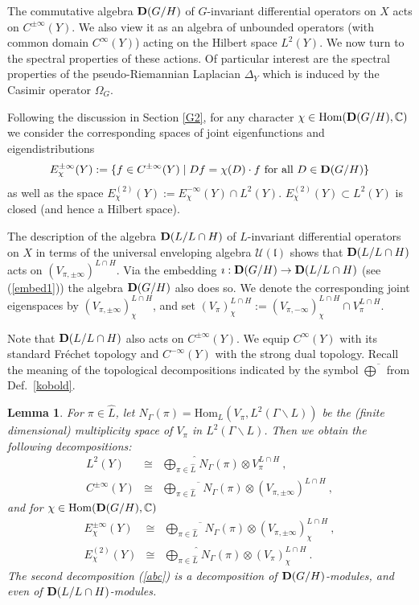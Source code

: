 \documentclass[10]{amsart}
\newtheorem{lem}[thm]{Lemma}
\theoremstyle{remark}
\theoremstyle{definition}
\numberwithin{equation}{section}
\newcommand{\C}{\mathbb{C}}           %
\newcommand{\Hom}{\mathrm{Hom}}
\newcommand{\fl}{{\mathfrak l}}
\newcommand{\Cal}{\mathcal}
\begin{document}
{The commutative algebra  ${\bf D}(G/H)$ of $G$-invariant differential operators on $X$ acts on $C^{\pm\infty}(Y)$. We also view it as an algebra of unbounded operators (with common domain $C^{\infty}(Y)$) acting on the Hilbert space $L^2(Y)$. We now turn to the spectral properties of these actions.
Of particular interest are the spectral properties of the pseudo-Riemannian Laplacian $\Delta_Y$ which is induced by the Casimir operator $\Omega_G$.

Following the discussion in Section \ref{G2},
for any character $\chi\in\Hom( {\bf D}(G/H),\C)$
we consider the corresponding spaces of joint eigenfunctions and eigendistributions
$$ {E}_\chi^{\pm\infty}(Y):=\{f\in C^{\pm\infty}(Y)\mid Df=\chi(D)\cdot f\mbox{ for all } D\in {\bf D}(G/H)\}$$
as well as the space ${E}_\chi^{(2)}(Y):={E}_\chi^{-\infty}(Y)\cap L^2(Y)$.
${E}_\chi^{(2)}(Y)
\subset L^2(Y)$
 is closed (and hence a Hilbert space).

The description of the algebra ${\bf D}(L/L\cap H)$ of $L$-invariant differential operators on $X$ in terms of the universal enveloping algebra ${\Cal U}(\fl)$
shows that  ${\bf D}(L/L\cap H)$ acts on $(V_{\pi,\pm\infty})^{L\cap H}$.
Via the embedding $\imath: {\bf D}(G/H)\rightarrow {\bf D}(L/L\cap H)$ (see (\ref{embed1})) the algebra ${\bf D}(G/H)$ also does so.
We denote the corresponding joint eigenspaces by $(V_{\pi,\pm\infty})_\chi^{L\cap H}$, and set 
$(V_{\pi})^{L\cap H}_\chi:=(V_{\pi,-\infty})^{L\cap H}_\chi\cap V_\pi^{L\cap H}$.

Note that ${\bf D}(L/L\cap H)$ also acts on $C^{\pm\infty}(Y)$. We equip $C^\infty(Y)$ with its standard Fr\' echet topology and $C^{-\infty}(Y)$ with the strong dual topology.
Recall the meaning of the topological decompositions indicated by the symbol $\overline{\bigoplus}$ from Def.~\ref{kobold}.


%
\begin{lem}\label{bassa}
For $\pi\in\hat L$, let $N_\Gamma(\pi)= \Hom_L(V_\pi, L^2(\Gamma\backslash L))$ be the (finite dimensional) multiplicity space of $V_\pi$ in $L^2(\Gamma\backslash L)$.
Then we obtain the following decompositions:
\begin{eqnarray}
L^2(Y)&\cong &\widehat{\bigoplus_{\pi\in\widehat L}} N_\Gamma(\pi)\otimes V_{\pi}^{L\cap H}\ ,\nonumber\\
C^{\pm\infty}(Y)&\cong& \overline{\bigoplus_{\pi\in\widehat L}} N_\Gamma(\pi)\otimes (V_{\pi,\pm\infty})^{L\cap H}\label{abc}\ ,
\end{eqnarray}
and for $\chi\in\Hom( {\bf D}(G/H),\C)$
\begin{eqnarray*}
{E}_\chi^{\pm\infty}(Y)&\cong& \overline{\bigoplus_{\pi\in\widehat L}} N_\Gamma(\pi)\otimes (V_{\pi,\pm\infty})^{L\cap H}_\chi\ ,\nonumber\\
{E}_\chi^{(2)}(Y)&\cong &\widehat{\bigoplus_{\pi\in\widehat L}} N_\Gamma(\pi)\otimes (V_{\pi})^{L\cap H}_\chi\ .\nonumber
\end{eqnarray*}
 The second decomposition (\ref{abc}) is a decomposition of ${\bf D}(G/H)$-modules, and even of ${\bf D}(L/L\cap H)$-modules.
\end{lem} 

}
\end{document}
